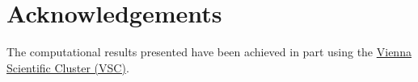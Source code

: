 \documentclass[11pt,a4paper]{article}
\begin{document}
\section*{Acknowledgements} %
The computational results presented have been achieved in part using the \href{http://vsc.ac.at}{Vienna
Scientific Cluster (VSC)}.

\medskip



\end{document}

